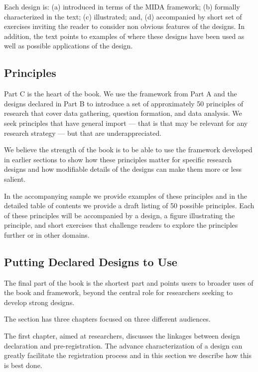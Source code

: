 \documentclass[11pt]{article}
\begin{document}
Each design is: (a) introduced in terms of the MIDA framework; (b) formally characterized in the text; (c) illustrated; and, (d) accompanied by short set of exercises inviting the reader to consider non obvious features of the designs. In addition, the text points to examples of where these designs have been used as well as possible applications of the design.

\subsection{Principles}
Part C is the heart of the book. We use the framework from Part A and the designs declared in Part B to introduce a set of approximately 50 principles of research that cover data gathering, question formation, and data analysis. We seek principles that have general import --- that is that may be relevant for any research strategy --- but that are underappreciated.

We believe the strength of the book is to be able to use the framework developed in earlier sections to show how these principles matter for specific research designs and how modifiable details of the designs can make them more or less salient. 

In the accompanying sample we provide examples of these principles and in the detailed table of contents we provide a draft listing  of 50 possible principles. Each of these principles will be accompanied by a design, a figure illustrating the principle, and short exercises that challenge readers to explore the principles further or in other domains. 

\subsection{Putting Declared Designs to Use}
The final part of the book is the shortest part and points users to broader uses of the book and framework, beyond the central role for researchers seeking to develop strong designs.

The section has three chapters focused on three different audiences.

The first chapter, aimed at researchers, discusses the linkages between design declaration and pre-registration. The advance characterization of a design can greatly facilitate the registration process and in this section we describe how this is best done. 
\end{document}
